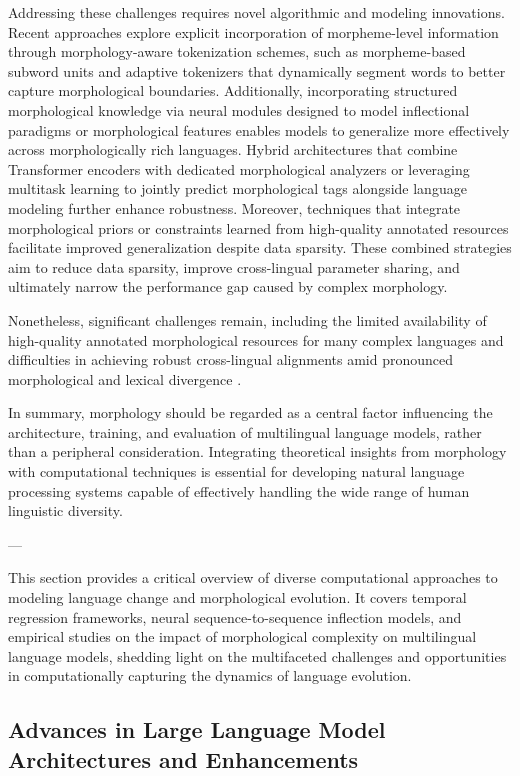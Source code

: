 \documentclass[sigconf]{acmart}
\begin{document}
Addressing these challenges requires novel algorithmic and modeling innovations. Recent approaches explore explicit incorporation of morpheme-level information through morphology-aware tokenization schemes, such as morpheme-based subword units and adaptive tokenizers that dynamically segment words to better capture morphological boundaries. Additionally, incorporating structured morphological knowledge via neural modules designed to model inflectional paradigms or morphological features enables models to generalize more effectively across morphologically rich languages. Hybrid architectures that combine Transformer encoders with dedicated morphological analyzers or leveraging multitask learning to jointly predict morphological tags alongside language modeling further enhance robustness. Moreover, techniques that integrate morphological priors or constraints learned from high-quality annotated resources facilitate improved generalization despite data sparsity. These combined strategies aim to reduce data sparsity, improve cross-lingual parameter sharing, and ultimately narrow the performance gap caused by complex morphology.

Nonetheless, significant challenges remain, including the limited availability of high-quality annotated morphological resources for many complex languages and difficulties in achieving robust cross-lingual alignments amid pronounced morphological and lexical divergence \cite{ref34}.

In summary, morphology should be regarded as a central factor influencing the architecture, training, and evaluation of multilingual language models, rather than a peripheral consideration. Integrating theoretical insights from morphology with computational techniques is essential for developing natural language processing systems capable of effectively handling the wide range of human linguistic diversity.

---

This section provides a critical overview of diverse computational approaches to modeling language change and morphological evolution. It covers temporal regression frameworks, neural sequence-to-sequence inflection models, and empirical studies on the impact of morphological complexity on multilingual language models, shedding light on the multifaceted challenges and opportunities in computationally capturing the dynamics of language evolution.

\subsection{Advances in Large Language Model Architectures and Enhancements}
\end{document}
